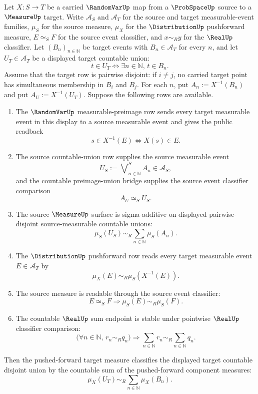 \begin{theorem}
\label{thm:distribution-pushforward-countable-disjoint-sigma-additivity}
Let $X:S\to T$ be a carried $\RandomVarUp$ map from a $\ProbSpaceUp$ source to a $\MeasureUp$ target. Write $\mathcal{A}_S$ and $\mathcal{A}_T$ for the source and target measurable-event families, $\mu_S$ for the source measure, $\mu_X$ for the $\DistributionUp$ pushforward measure, $E\simeq_S F$ for the source event classifier, and $x\sim_R y$ for the $\RealUp$ classifier.
Let $(B_n)_{n\in\mathbb N}$ be target events with $B_n\in\mathcal{A}_T$ for every $n$, and let $U_T\in\mathcal{A}_T$ be a displayed target countable union:
$$
t\in U_T\Longleftrightarrow \exists n\in\mathbb N,\, t\in B_n.
$$
Assume that the target row is pairwise disjoint: if $i\neq j$, no carried target point has simultaneous membership in $B_i$ and $B_j$.
For each $n$, put $A_n:=X^{-1}(B_n)$ and put $A_U:=X^{-1}(U_T)$. Suppose the following rows are available.
\begin{enumerate}
\item The $\RandomVarUp$ measurable-preimage row sends every target measurable event in this display to a source measurable event and gives the public readback
$$
 s\in X^{-1}(E)\Longleftrightarrow X(s)\in E.
$$
\item The source countable-union row supplies the source measurable event
$$
U_S:=\bigvee\nolimits^S_{n\in\mathbb N}A_n\in\mathcal{A}_S,
$$
and the countable preimage-union bridge supplies the source event classifier comparison
$$
A_U\simeq_S U_S.
$$
\item The source $\MeasureUp$ surface is sigma-additive on displayed pairwise-disjoint source-measurable countable unions:
$$
\mu_S(U_S)\sim_R\sum_{n\in\mathbb N}\mu_S(A_n).
$$
\item The $\DistributionUp$ pushforward row reads every target measurable event $E\in\mathcal{A}_T$ by
$$
\mu_X(E)\sim_R\mu_S(X^{-1}(E)).
$$
\item The source measure is readable through the source event classifier:
$$
E\simeq_S F\Longrightarrow \mu_S(E)\sim_R\mu_S(F).
$$
\item The countable $\RealUp$ sum endpoint is stable under pointwise $\RealUp$ classifier comparison:
$$
\bigl(\forall n\in\mathbb N,\, r_n\sim_R q_n\bigr)\Longrightarrow\sum_{n\in\mathbb N}r_n\sim_R\sum_{n\in\mathbb N}q_n.
$$
\end{enumerate}
Then the pushed-forward target measure classifies the displayed target countable disjoint union by the countable sum of the pushed-forward component measures:
$$
\mu_X(U_T)\sim_R\sum_{n\in\mathbb N}\mu_X(B_n).
$$
\end{theorem}
